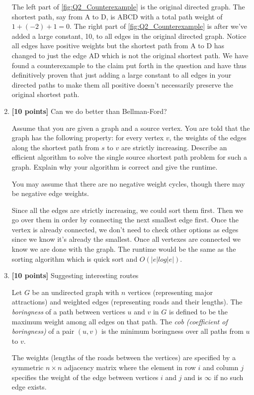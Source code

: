 \documentclass[11pt]{article}
\begin{document}
\begin{enumerate}
The left part of \ref{fig:Q2_Counterexample} is the original directed graph. The shortest path, say from A to D, is ABCD with a total path weight of $1+(-2)+1=0$. The right part of \ref{fig:Q2_Counterexample} is after we've added a large constant, 10, to all edges in the original directed graph. Notice all edges have positive weights but the shortest path from A to D has changed to just the edge AD which is not the original shortest path. We have found a counterexample to the claim put forth in the question and have thus definitively proven that just adding a large constant to all edges in your directed paths to make them all positive doesn't necessarily preserve the original shortest path.

\item \textbf{[10 points]} Can we do better than Bellman-Ford?

Assume that you are given a graph and a source vertex.  You 
are told that the graph has the
following property: for every vertex $v$, the weights of the edges
along the shortest path from
$s$ to $v$ are strictly increasing.  Describe an efficient algorithm
to solve the single source shortest path problem
for such a graph.  Explain why your algorithm is correct and give the
runtime.

You may assume that 
there are no negative weight cycles, though there may be negative
edge weights.
 
 Since all the edges are strictly increasing, we could sort them first. Then we go over them in order by connecting the next smallest edge first. Once the vertex is already connected, we don't need to check other options as edges since we know it's already the smallest. Once all vertexes are connected we know we are done with the graph. The runtime would be the same as the sorting algorithm which is quick sort and $O(|e|log|e|)$.  
 
 \item \textbf{[10 points]} Suggesting interesting routes

Let $G$ be an undirected graph with $n$ vertices 
(representing major 
attractions) and weighted edges (representing roads and their lengths).  
The {\em boringness} of a path between vertices $u$ and $v$ in $G$ is
defined to be the maximum weight among all edges on that path.  The
{\em cob (coefficient of boringness)} of a pair $(u,v)$ is the
minimum boringness over all paths from $u$ to $v$.

The weights (lengths of the roads between the vertices) are specified
by a symmetric $n \times n$ adjacency matrix where the element in row
$i$ and column $j$ specifies the weight of the edge between vertices
$i$ and $j$ and is $\infty$ if no such edge exists.


\end{enumerate}
\end{document}
